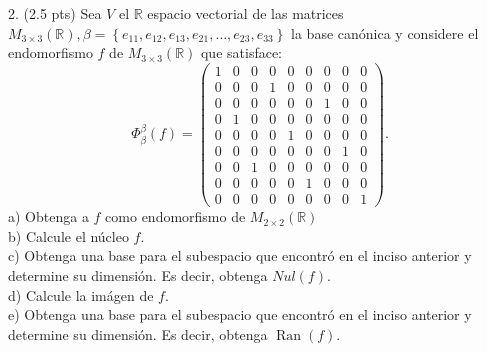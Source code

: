 2. (2.5 pts) Sea \( V \) el \( \mathbb{R} \) espacio vectorial de las matrices \( M_{3 \times 3}(\mathbb{R}), \beta=\left\{e_{11}, e_{12}, e_{13}, e_{21}, \ldots, e_{23}, e_{33}\right\} \) la base canónica y considere el endomorfismo \( f \) de \( M_{3 \times 3}(\mathbb{R}) \) que satisface:
\[
\Phi_{\beta}^{\beta}(f)=\left(\begin{array}{lllllllll}
1 & 0 & 0 & 0 & 0 & 0 & 0 & 0 & 0 \\
0 & 0 & 0 & 1 & 0 & 0 & 0 & 0 & 0 \\
0 & 0 & 0 & 0 & 0 & 0 & 1 & 0 & 0 \\
0 & 1 & 0 & 0 & 0 & 0 & 0 & 0 & 0 \\
0 & 0 & 0 & 0 & 1 & 0 & 0 & 0 & 0 \\
0 & 0 & 0 & 0 & 0 & 0 & 0 & 1 & 0 \\
0 & 0 & 1 & 0 & 0 & 0 & 0 & 0 & 0 \\
0 & 0 & 0 & 0 & 0 & 1 & 0 & 0 & 0 \\
0 & 0 & 0 & 0 & 0 & 0 & 0 & 0 & 1
\end{array}\right) .
\]
a) Obtenga a \( f \) como endomorfismo de \( M_{2 \times 2}(\mathbb{R}) \) \\
b) Calcule el núcleo \( f \). \\
c) Obtenga una base para el subespacio que encontró en el inciso anterior y determine su dimensión. Es decir, obtenga \( N u l(f) \). \\ 
d) Calcule la imágen de \( f \). \\
e) Obtenga una base para el subespacio que encontró en el inciso anterior y determine su dimensión. Es decir, obtenga \( \operatorname{Ran}(f) \). \\

